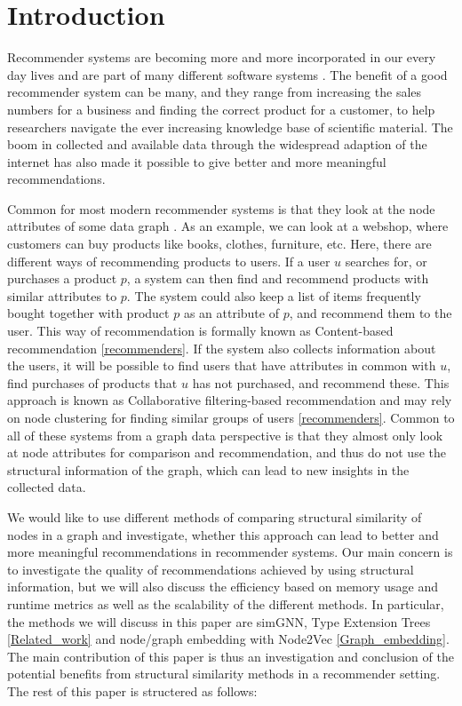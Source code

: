 \section{Introduction}
  Recommender systems are becoming more and more incorporated in our every day lives and are part of many different software systems \cite{recommender_e-comerce}. The benefit of a good recommender system can be many, and they range from increasing the sales numbers for a business and finding the correct product for a customer, to help researchers navigate the ever increasing knowledge base of scientific material. The boom in collected and available data through the widespread adaption of the internet has also made it possible to give better and more meaningful recommendations.

  Common for most modern recommender systems is that they look at the node attributes of some data graph \cite{Ricci2015}. As an example, we can look at a webshop, where customers can buy products like books, clothes, furniture, etc. Here, there are different ways of recommending products to users. If a user $u$ searches for, or purchases a product $p$, a system can then find and recommend products with similar attributes to $p$. The system could also keep a list of items frequently bought together with product $p$ as an attribute of $p$, and recommend them to the user. This way of recommendation is formally known as Content-based recommendation \ref{recommenders}. If the system also collects information about the users, it will be possible to find users that have attributes in common with $u$, find purchases of products that $u$ has not purchased, and recommend these. This approach is known as Collaborative filtering-based recommendation and may rely on node clustering for finding similar groups of users \ref{recommenders}. Common to all of these systems from a graph data perspective is that they almost only look at node attributes for comparison and recommendation, and thus do not use the structural information of the graph, which can lead to new insights in the collected data.

  We would like to use different methods of comparing structural similarity of nodes in a graph and investigate, whether this approach can lead to better and more meaningful recommendations in recommender systems. Our main concern is to investigate the quality of recommendations achieved by using structural information, but we will also discuss the efficiency based on memory usage and runtime metrics as well as the scalability of the different methods. In particular, the methods we will discuss in this paper are simGNN, Type Extension Trees \ref{Related_work} and node/graph embedding with Node2Vec \ref{Graph_embedding}.
  The main contribution of this paper is thus an investigation and conclusion of the potential benefits from structural similarity methods in a recommender setting. The rest of this paper is structered as follows:
